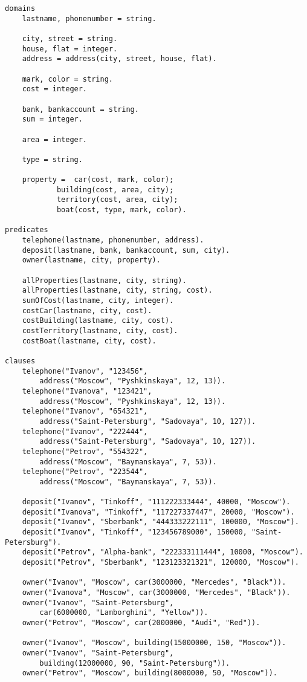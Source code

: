 \begin{lstlisting}[caption=Текст программы]
domains
	lastname, phonenumber = string.

	city, street = string.
	house, flat = integer.
	address = address(city, street, house, flat).

	mark, color = string.
	cost = integer.

	bank, bankaccount = string.
	sum = integer.

	area = integer.

	type = string.

	property = 	car(cost, mark, color);
			building(cost, area, city);
			territory(cost, area, city);
			boat(cost, type, mark, color).

predicates
	telephone(lastname, phonenumber, address).
	deposit(lastname, bank, bankaccount, sum, city).
	owner(lastname, city, property).

	allProperties(lastname, city, string).
	allProperties(lastname, city, string, cost).
	sumOfCost(lastname, city, integer).
	costCar(lastname, city, cost).
	costBuilding(lastname, city, cost).
	costTerritory(lastname, city, cost).
	costBoat(lastname, city, cost).

clauses
	telephone("Ivanov", "123456",
		address("Moscow", "Pyshkinskaya", 12, 13)).
	telephone("Ivanova", "123421",
		address("Moscow", "Pyshkinskaya", 12, 13)).
	telephone("Ivanov", "654321",
		address("Saint-Petersburg", "Sadovaya", 10, 127)).
	telephone("Ivanov", "222444",
		address("Saint-Petersburg", "Sadovaya", 10, 127)).
	telephone("Petrov", "554322",
		address("Moscow", "Baymanskaya", 7, 53)).
	telephone("Petrov", "223544",
		address("Moscow", "Baymanskaya", 7, 53)).

	deposit("Ivanov", "Tinkoff", "111222333444", 40000, "Moscow").
	deposit("Ivanova", "Tinkoff", "117227337447", 20000, "Moscow").
	deposit("Ivanov", "Sberbank", "444333222111", 100000, "Moscow").
	deposit("Ivanov", "Tinkoff", "123456789000", 150000, "Saint-Petersburg").
	deposit("Petrov", "Alpha-bank", "222333111444", 10000, "Moscow").
	deposit("Petrov", "Sberbank", "123123321321", 120000, "Moscow").

	owner("Ivanov", "Moscow", car(3000000, "Mercedes", "Black")).
	owner("Ivanova", "Moscow", car(3000000, "Mercedes", "Black")).
	owner("Ivanov", "Saint-Petersburg",
		car(6000000, "Lamborghini", "Yellow")).
	owner("Petrov", "Moscow", car(2000000, "Audi", "Red")).

	owner("Ivanov", "Moscow", building(15000000, 150, "Moscow")).
	owner("Ivanov", "Saint-Petersburg",
		building(12000000, 90, "Saint-Petersburg")).
	owner("Petrov", "Moscow", building(8000000, 50, "Moscow")).


\end{lstlisting}
